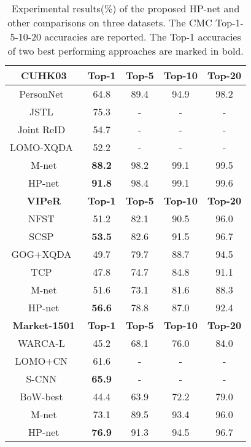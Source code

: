 \documentclass[10pt,twocolumn,letterpaper]{article}
\begin{document}
\begin{table}[t]
\begin{footnotesize}
\begin{center}
\begin{tabular}{c|cccc}
\hline
\textbf{CUHK03}&\textbf{Top-1}&\textbf{Top-5}&\textbf{Top-10}&\textbf{Top-20}\\\hline
PersonNet~\cite{wu2016personnet} & 64.8 & 89.4 & 94.9 & 98.2 \\
JSTL~\cite{xiao2016learning} & 75.3 & - & - & - \\
Joint ReID~\cite{ahmed2015improved} & 54.7 & - & - & - \\
LOMO-XQDA~\cite{liao2015person} & 52.2 & - & - & - \\\hline
M-net & \textbf{88.2} & 98.2 & 99.1 & 99.5\\
HP-net  & \textbf{91.8} & 98.4 & 99.1 & 99.6\\
\hline
\hline
\textbf{VIPeR}&\textbf{Top-1}&\textbf{Top-5}&\textbf{Top-10}&\textbf{Top-20}\\\hline
NFST~\cite{zhang2016learning} & 51.2 & 82.1 & 90.5 & 96.0\\
SCSP~\cite{chen2016similarity}& \textbf{53.5} & 82.6 & 91.5 & 96.7\\
GOG+XQDA~\cite{matsukawa2016hierarchical} & 49.7 & 79.7 & 88.7 & 94.5 \\
TCP~\cite{cheng2016person} & 47.8 & 74.7 & 84.8 & 91.1 \\\hline
M-net & 51.6 & 73.1 & 81.6 & 88.3\\
HP-net & \textbf{56.6} & 78.8 & 87.0 & 92.4\\
\hline
\hline
\textbf{Market-1501}&\textbf{Top-1}&\textbf{Top-5}&\textbf{Top-10}&\textbf{Top-20}\\\hline
WARCA-L~\cite{jose2016scalable} & 45.2 & 68.1 & 76.0 & 84.0 \\
LOMO+CN~\cite{varior2016siamese} & 61.6 & - & - & - \\
S-CNN~\cite{varior2016gated} & \textbf{65.9} & - & - & - \\
BoW-best~\cite{zheng2015scalable} & 44.4 & 63.9 & 72.2 & 79.0 \\\hline
M-net & 73.1 & 89.5 & 93.4 & 96.0 \\
HP-net & \textbf{76.9} & 91.3 & 94.5 & 96.7 \\
\hline
\end{tabular}
\end{center}
\caption{Experimental results(\%) of the proposed HP-net and other comparisons on three datasets. The CMC Top-1-5-10-20 accuracies are reported. The Top-1 accuracies of two best performing approaches are marked in bold.}
\label{tab:accuracy}
\vspace{-0.1cm}
\end{footnotesize}
\end{table}
\end{document}
